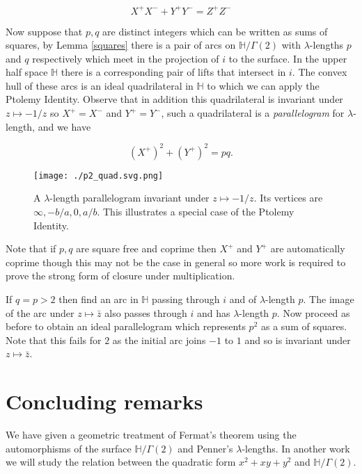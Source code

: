 \documentclass[12pt,a4paper]{amsart}
\def\HH{\mathbb{H}}
\def\xx{\HH/g2}
\def\g2{\Gamma(2)}
\def\xx{\HH/\g2}
\begin{document}
\begin{equation}
	X^+ X^-
	+ Y^+ Y^- = Z^+ Z^-
\end{equation}

Now suppose that $p,q$ are distinct integers which can be written as
sums of squares, by Lemma \ref{squares} there is a pair of arcs on
$\xx$ with $\lambda$-lengths $p$ and $q$ respectively which meet in
the projection of $i$ to the surface. In the upper half space $\HH$
there is a corresponding pair of lifts that intersect in $i$. The
convex hull of these arcs is an ideal quadrilateral in $\HH$ to
which we can apply the Ptolemy Identity. Observe that in addition
this quadrilateral is invariant under $z \mapsto -1/z$ so $X^+ =
X^-$ and $Y^+ = Y^-$, such a quadrilateral is a
\textit{parallelogram} for $\lambda$-length, and we have

\begin{equation}
	(X^+)^2 + (Y^+)^2 = pq.
\end{equation}

\begin{figure}[ht]
\begin{center}
	\texttt{[image: ./p2\_quad.svg.png]}
\end{center}
\caption{A $\lambda$-length parallelogram 
invariant under $z\mapsto -1/z$. Its vertices are $\infty, -b/a, 0,
a/b$. This illustrates a special case of the Ptolemy Identity.}
\label{pythagoras}
\end{figure}

Note that if $p,q$ are square free and coprime then $X^+$ and
$Y^+$ are automatically coprime though this may not be the case in
general so more work is required to prove the strong form of closure
under multiplication.

If $q=p>2$ then find an arc in $\HH$ passing through $i$ and of
$\lambda$-length $p$. The image of the arc under $z \mapsto \bar{z}$
also passes through $i$ and has $\lambda$-length $p$. Now proceed as
before to obtain an ideal parallelogram
which represents $p^2$ as a sum of squares.
Note that this fails for $2$ as the initial arc joins $-1$ to $1$
and so is invariant under $z \mapsto \bar{z}$.

\section{Concluding remarks}

We have given a geometric treatment of Fermat's theorem
using the automorphisms of the surface
$\xx$ and Penner's $\lambda$-lengths. In another work we will study
the relation between the quadratic form $x^2 +xy + y^2$ and $\xx$.
\end{document}
